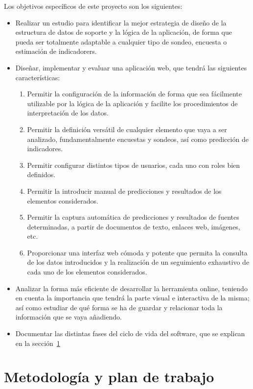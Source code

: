 Los objetivos específicos de este proyecto son los siguientes:

\begin{itemize}
\item Realizar un estudio para identificar la mejor estrategia de diseño de la estructura de datos de soporte y la lógica de la aplicación, de forma que pueda ser totalmente adaptable a cualquier tipo de sondeo, encuesta o estimación de indicadorers.
\item Diseñar, implementar y evaluar una aplicación web, que tendrá las
  siguientes características:

  \begin{enumerate}
  \item Permitir la configuración de la información de forma que sea fácilmente utilizable por la lógica de la aplicación y facilite los procedimientos de interpretación de los datos.
  \item Permitir la definición versátil de cualquier elemento que vaya a ser analizado, fundamentalmente encuestas y sondeos, así como predicción de indicadores.
  \item Permitir configurar distintos tipos de usuarios, cada uno con roles bien definidos.
  \item Permitir la introducir manual de predicciones y resultados  de los elementos considerados.
  \item Permitir la captura automática de predicciones y resultados de fuentes determinadas, a partir de documentos de texto, enlaces web, imágenes, etc.
  \item Proporcionar una interfaz web cómoda y potente que permita la consulta de los datos introducidos y la realización de un seguimiento exhaustivo de cada uno de los elementos considerados.
  \end{enumerate}

\item Analizar la forma más eficiente de desarrollar la herramienta online, teniendo en cuenta la importancia que tendrá la parte visual e interactiva de la misma; así como estudiar de qué forma se ha de guardar y relacionar toda la información que se vaya añadiendo.

\item Documentar las distintas fases del ciclo de vida del software, que se explican en la sección~\ref{sec:metodologia-y-plan}

\end{itemize}


\section{Metodología y plan de trabajo}
\label{sec:metodologia-y-plan}

